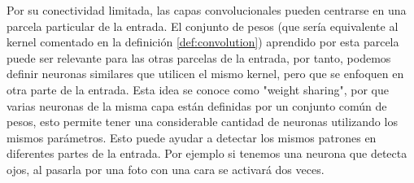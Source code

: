 \documentclass[12,twoside]{TFG-GM}
\theoremstyle{definition}
\theoremstyle{remark}
\begin{document}
Por su conectividad limitada, las capas convolucionales pueden centrarse en una parcela particular de la entrada. El conjunto de pesos (que sería equivalente al kernel comentado en la definición \ref{def:convolution}) aprendido por esta parcela puede ser relevante para las otras parcelas de la entrada, por tanto, podemos definir neuronas similares que utilicen el mismo kernel, pero que se enfoquen en otra parte de la entrada. Esta idea se conoce como "weight sharing", por que varias neuronas de la misma capa están definidas por un conjunto común de pesos, esto permite tener una considerable cantidad de neuronas utilizando los mismos parámetros. Esto puede ayudar a detectar los mismos patrones en diferentes partes de la entrada. Por ejemplo si tenemos una neurona que detecta ojos, al pasarla por una foto con una cara se activará dos veces.  
\end{document}
